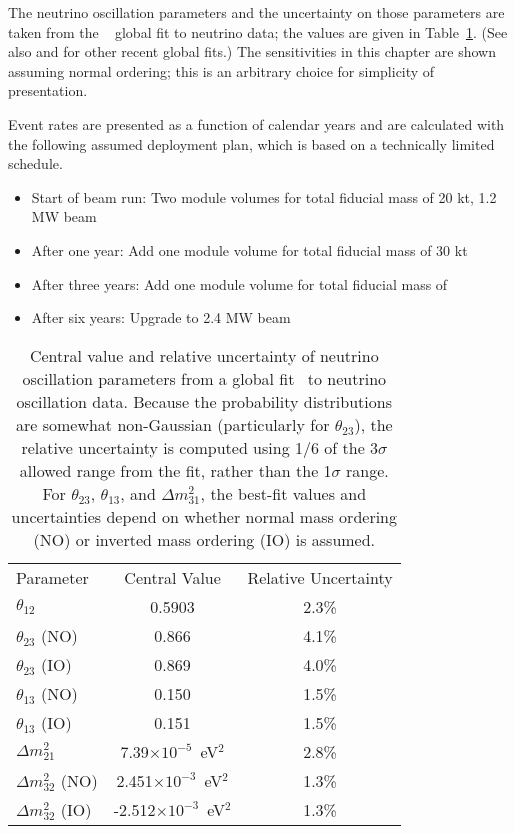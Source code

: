 The neutrino oscillation parameters and the uncertainty on those parameters are taken from the ~\cite{Esteban:2018azc,nufitweb} global fit to neutrino data; the
values are given in Table~\ref{tab:oscpar_nufit}.  (See also
\cite{deSalas:2017kay} and \cite{Capozzi:2017yic} for other recent global fits.) The sensitivities in this chapter are shown assuming normal ordering; this is an arbitrary choice for simplicity of presentation.

Event rates are presented as a function of calendar years and are calculated with the following assumed deployment plan, which is based on a technically limited schedule.
\begin{itemize}
    \item Start of beam run: Two  module %
    volumes for total fiducial mass of 20 kt, 1.2 MW beam
    \item After one year: Add one  module  volume for total fiducial mass of 30 kt
    \item After three years: Add one  module  volume for total fiducial mass of \fdfiducialmass
    \item After six years: Upgrade to 2.4 MW beam
\end{itemize}

\begin{table}[]
    \centering
    \begin{tabular}{lcc}
 Parameter &    Central Value & Relative Uncertainty \\
\toprowrule
$\theta_{12}$ & 0.5903 & 2.3\% \\ \colhline
$\theta_{23}$ (NO) & 0.866  & 4.1\% \\ 
$\theta_{23}$ (IO) & 0.869  & 4.0\% \\ \colhline
$\theta_{13}$ (NO) & 0.150  & 1.5\% \\ 
$\theta_{13}$ (IO) & 0.151  & 1.5\% \\ \colhline
$\Delta m^2_{21}$ & 7.39$\times10^{-5}$~eV$^2$ & 2.8\% \\ \colhline
$\Delta m^2_{32}$ (NO) & 2.451$\times10^{-3}$~eV$^2$ &  1.3\% \\
$\Delta m^2_{32}$ (IO) & -2.512$\times10^{-3}$~eV$^2$ &  1.3\% \\
    \end{tabular}
    \caption{Central value and relative uncertainty of neutrino oscillation parameters from a global fit~\cite{Esteban:2018azc,nufitweb} to neutrino oscillation data. Because the probability distributions are somewhat non-Gaussian (particularly for $\theta_{23}$), the relative uncertainty is computed using 1/6 of the 3$\sigma$ allowed range from the fit, rather than the 1$\sigma$ range.   For $\theta_{23}$, $\theta_{13}$, and $\Delta m^2_{31}$, the best-fit values and uncertainties depend on whether normal mass ordering (NO) or inverted mass ordering (IO) is assumed.}
    \label{tab:oscpar_nufit}
\end{table}

